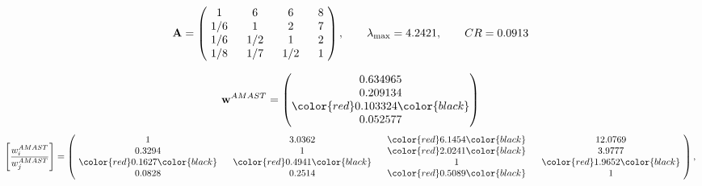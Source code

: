 \begin{example}
\begin{equation*}
\mathbf{A} =
\begin{pmatrix}
$\,\,$ 1 $\,\,$ & $\,\,$6$\,\,$ & $\,\,$6$\,\,$ & $\,\,$8 $\,\,$ \\
$\,\,$ 1/6$\,\,$ & $\,\,$ 1 $\,\,$ & $\,\,$2$\,\,$ & $\,\,$7 $\,\,$ \\
$\,\,$ 1/6$\,\,$ & $\,\,$ 1/2$\,\,$ & $\,\,$ 1 $\,\,$ & $\,\,$2 $\,\,$ \\
$\,\,$ 1/8$\,\,$ & $\,\,$ 1/7$\,\,$ & $\,\,$ 1/2$\,\,$ & $\,\,$ 1  $\,\,$ \\
\end{pmatrix},
\qquad
\lambda_{\max} =
4.2421,
\qquad
CR = 0.0913
\end{equation*}

\begin{equation*}
\mathbf{w}^{AMAST} =
\begin{pmatrix}
0.634965\\
0.209134\\
\color{red} 0.103324\color{black} \\
0.052577
\end{pmatrix}\end{equation*}
\begin{equation*}
\left[ \frac{{w}^{AMAST}_i}{{w}^{AMAST}_j} \right] =
\begin{pmatrix}
$\,\,$ 1 $\,\,$ & $\,\,$3.0362$\,\,$ & $\,\,$\color{red} 6.1454\color{black} $\,\,$ & $\,\,$12.0769$\,\,$ \\
$\,\,$0.3294$\,\,$ & $\,\,$ 1 $\,\,$ & $\,\,$\color{red} 2.0241\color{black} $\,\,$ & $\,\,$3.9777  $\,\,$ \\
$\,\,$\color{red} 0.1627\color{black} $\,\,$ & $\,\,$\color{red} 0.4941\color{black} $\,\,$ & $\,\,$ 1 $\,\,$ & $\,\,$\color{red} 1.9652\color{black}  $\,\,$ \\
$\,\,$0.0828$\,\,$ & $\,\,$0.2514$\,\,$ & $\,\,$\color{red} 0.5089\color{black} $\,\,$ & $\,\,$ 1  $\,\,$ \\
\end{pmatrix},
\end{equation*}


\end{example}
